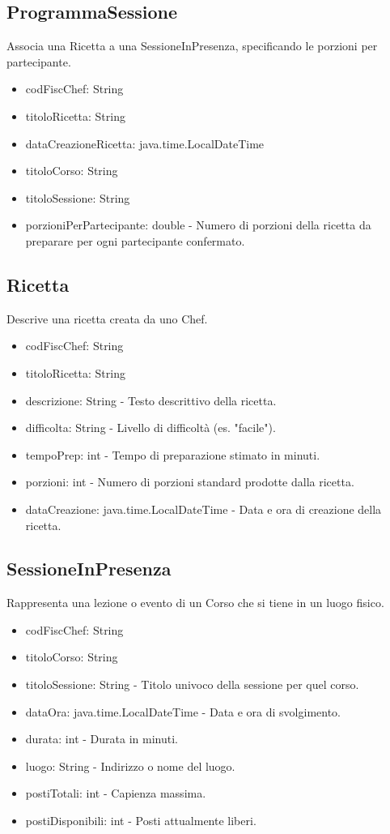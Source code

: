 \documentclass[a4paper, 12pt]{article}
\begin{document}
\subsection{ProgrammaSessione}
Associa una Ricetta a una SessioneInPresenza, specificando le porzioni per partecipante.
\begin{itemize}
    \item codFiscChef: String
    \item titoloRicetta: String
    \item dataCreazioneRicetta: java.time.LocalDateTime
    \item titoloCorso: String
    \item titoloSessione: String
    \item porzioniPerPartecipante: double - Numero di porzioni della ricetta da preparare per ogni partecipante confermato.
\end{itemize}

\subsection{Ricetta}
Descrive una ricetta creata da uno Chef.
\begin{itemize}
    \item codFiscChef: String
    \item titoloRicetta: String
    \item descrizione: String - Testo descrittivo della ricetta.
    \item difficolta: String - Livello di difficoltà (es. "facile").
    \item tempoPrep: int - Tempo di preparazione stimato in minuti.
    \item porzioni: int - Numero di porzioni standard prodotte dalla ricetta.
    \item dataCreazione: java.time.LocalDateTime - Data e ora di creazione della ricetta.
\end{itemize}

\subsection{SessioneInPresenza}
Rappresenta una lezione o evento di un Corso che si tiene in un luogo fisico.
\begin{itemize}
    \item codFiscChef: String
    \item titoloCorso: String
    \item titoloSessione: String - Titolo univoco della sessione per quel corso.
    \item dataOra: java.time.LocalDateTime - Data e ora di svolgimento.
    \item durata: int - Durata in minuti.
    \item luogo: String - Indirizzo o nome del luogo.
    \item postiTotali: int - Capienza massima.
    \item postiDisponibili: int - Posti attualmente liberi.
\end{itemize}
\end{document}
